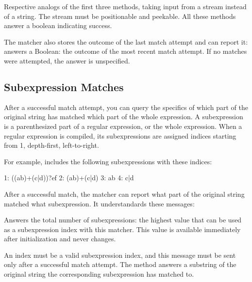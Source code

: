 \documentclass[a4paper,10pt,twoside]{book}
\begin{document}
{\begin{description}
\item {} Respective analogs of the first three methods, taking input from a stream instead of a string. The stream must be positionable and peekable. All these methods answer a boolean indicating success.

\item  The matcher also stores the outcome of the last match attempt and can report it: 
 answers a Boolean: the outcome of the most recent match attempt. If no matches were attempted, the answer is unspecified. 

\end{description}



\subsection{Subexpression Matches}

 After a successful match attempt, you can query the specifics of which part of the original string has matched which part of the whole expression. A subexpression is a parenthesized part of a regular expression, or the whole expression. When a regular expression is compiled, its subexpressions are assigned indices starting from 1, depth-first, left-to-right. 
 
 For example,  includes the following subexpressions with these indices: 

\begin{code}{}
 1:	((ab)+(c|d))?ef 	2:	(ab)+(c|d) 	3:	ab 	4:	c|d
\end{code}


 
  After a successful match, the matcher can report what part of the original string matched what subexpression. It understandards these messages: 
  
 \begin{description}
\item {} 	Answers the total number of subexpressions: the highest value that can be used as a subexpression index with this matcher. This value 	is available immediately after initialization and never changes. 

\item {} An index must be a valid subexpression index, and this message must be sent only after a successful match attempt. The method answers a substring of the original string the corresponding subexpression has matched to. 


\end{description}}
\end{document}
